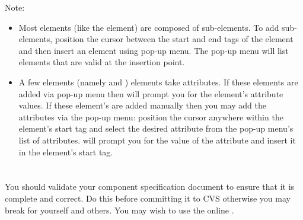 \documentclass[11pt]{article}
\begin{document}
Note:

\begin{itemize}
\item Most elements (like the  element) are composed of
  sub-elements.  To add sub-elements, position the cursor between the
  start and end tags of the element and then insert an element using
  \emacs{} pop-up menu.  The pop-up menu will list elements that are
  valid at the insertion point.
\item A few elements (namely  and )
  elements take attributes.  If these elements are added via \emacs{}
  pop-up menu then \emacs{} will prompt you for the element's
  attribute values.  If these element's are added manually then you
  may add the attributes via the pop-up menu: position the cursor
  anywhere within the element's start tag and select the desired
  attribute from the pop-up menu's list of attributes.  \Emacs{} will
  prompt you for the value of the attribute and insert it in the
  element's start tag.
\end{itemize}

\section{\SECvalidation}
\label{\SECvalidation}

You should  validate your component specification document to ensure that it
is complete and correct.  Do this before committing it to CVS otherwise you
may break \sr{} for yourself and others.  You may wish to use the online .

\begin{htmlonly}

\end{htmlonly}
\end{document}

